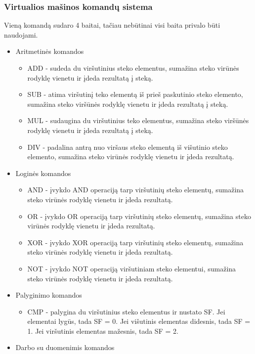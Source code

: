 	\subsubsection{Virtualios mašinos komandų sistema}
	Vieną komandą sudaro 4 baitai, tačiau nebūtinai visi baita privalo būti naudojami.
	\begin{itemize}
	\item Aritmetinės komandos
		\begin{itemize}
		\item ADD - sudeda du viršutinius steko elementus, sumažina steko virūnės rodyklę vienetu ir įdeda rezultatą į steką.
		\item SUB - atima viršutinį teko elementą iš prieš paskutinio steko elemento, sumažina steko viršūnės rodyklę vienetu ir įdeda rezultatą į steką.
		\item MUL - sudaugina du viršutinius teko elementus, sumažina steko viršūnės rodyklę vienetu ir įdeda rezultatą į steką.
		\item DIV - padalina antrą nuo viršaus steko elementą iš višutinio steko elemento, sumažina steko virūnės rodyklę vienetu ir įdeda rezultatą.
		\end{itemize}
	\item Loginės komandos
		\begin{itemize}
		\item AND - įvykdo AND operaciją tarp viršutinių steko elementų, sumažina steko virūnės rodyklę vienetu ir įdeda rezultatą.
		\item OR - įvykdo OR operaciją tarp viršutinių steko elementų, sumažina steko virūnės rodyklę vienetu ir įdeda rezultatą.
		\item XOR - įvykdo XOR operaciją tarp viršutinių steko elementų, sumažina steko virūnės rodyklę vienetu ir įdeda rezultatą.
		\item NOT - įvykdo NOT operaciją viršutiniam steko elementui, sumažina steko virūnės rodyklę vienetu ir įdeda rezultatą.
		\end{itemize}
	\item Palyginimo komandos
		\begin{itemize}
		\item CMP - palygina du viršutinius steko elementus ir nustato SF. Jei elementai lygūs, tada SF = 0. Jei višutinis elementas didesnis, tada SF = 1. Jei viršutinis elementas mažesnis, tada SF = 2.
		\end{itemize}
	\item Darbo su duomenimis komandos
		\begin{itemize}

\end{itemize}
\end{itemize}
